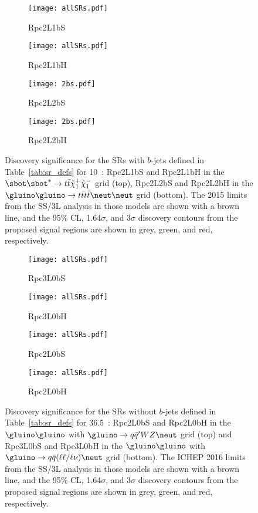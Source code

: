 \begin{figure}
\centering
\begin{subfigure}[t]{0.48\textwidth}
\caption{Rpc2L1bS}
\texttt{[image: allSRs.pdf]}
\end{subfigure}
\begin{subfigure}[t]{0.48\textwidth}
\caption{Rpc2L1bH}
\texttt{[image: allSRs.pdf]}
\end{subfigure}
\begin{subfigure}[t]{0.48\textwidth}
\caption{Rpc2L2bS}
\texttt{[image: 2bs.pdf]}
\end{subfigure}
\begin{subfigure}[t]{0.48\textwidth}
\caption{Rpc2L2bH}
\texttt{[image: 2bs.pdf]}
\end{subfigure}
\caption{Discovery significance for the SRs with $b$-jets defined in Table~\ref{tab:sr_defs} for 10~\ifb: Rpc2L1bS and  Rpc2L1bH in the $\sbot\sbot^*\to t\bar t\tilde\chi_1^+\tilde\chi_1^-$ grid (top), Rpc2L2bS and Rpc2L2bH in the $\gluino\gluino\to t\bar tt\bar t\neut\neut$ grid (bottom). The 2015 limits from the SS/3L analysis in those models are shown with a brown line, and the 95\% CL, 1.64$\sigma$, and 3$\sigma$ discovery contours from the proposed signal regions are shown in grey, green, and red, respectively. 
}
\label{fig:SR_withB}
\end{figure}


\begin{figure}
\centering
\begin{subfigure}[t]{0.48\textwidth}
\caption{Rpc3L0bS}
\texttt{[image: allSRs.pdf]}
\end{subfigure}
\begin{subfigure}[t]{0.48\textwidth}
\caption{Rpc3L0bH}
\texttt{[image: allSRs.pdf]}
\end{subfigure}
\begin{subfigure}[t]{0.48\textwidth}
\caption{Rpc2L0bS}
\texttt{[image: allSRs.pdf]}
\end{subfigure}
\begin{subfigure}[t]{0.48\textwidth}
\caption{Rpc2L0bH}
\texttt{[image: allSRs.pdf]}
\end{subfigure}
\caption{Discovery significance for the SRs without $b$-jets defined in Table~\ref{tab:sr_defs} for 36.5~\ifb: Rpc2L0bS and Rpc2L0bH in the $\gluino\gluino$ with $\gluino\to q\bar{q}'WZ\neut$ grid (top) and Rpc3L0bS and Rpc3L0bH in the $\gluino\gluino$ with $\gluino\to q\bar{q}(\ell\ell/\ell\nu)\neut$ grid (bottom). The ICHEP 2016 limits from the SS/3L analysis in those models are shown with a brown line, and the 95\% CL, 1.64$\sigma$, and 3$\sigma$ discovery contours from the proposed signal regions are shown in grey, green, and red, respectively.
}
\label{fig:SR_noB}
\end{figure}


